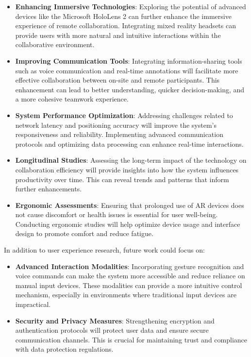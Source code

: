 \begin{itemize}
    \item \textbf{Enhancing Immersive Technologies}: Exploring the potential of advanced devices like the Microsoft HoloLens 2 can further enhance the immersive experience of remote collaboration. Integrating mixed reality headsets can provide users with more natural and intuitive interactions within the collaborative environment.
    \item \textbf{Improving Communication Tools}: Integrating information-sharing tools such as voice communication and real-time annotations will facilitate more effective collaboration between on-site and remote participants. This enhancement can lead to better understanding, quicker decision-making, and a more cohesive teamwork experience.
    \item \textbf{System Performance Optimization}: Addressing challenges related to network latency and positioning accuracy will improve the system's responsiveness and reliability. Implementing advanced communication protocols and optimizing data processing can enhance real-time interactions.


    \item \textbf{Longitudinal Studies}: Assessing the long-term impact of the technology on collaboration efficiency will provide insights into how the system influences productivity over time. This can reveal trends and patterns that inform further enhancements.
    \item \textbf{Ergonomic Assessments}: Ensuring that prolonged use of AR devices does not cause discomfort or health issues is essential for user well-being. Conducting ergonomic studies will help optimize device usage and interface design to promote comfort and reduce fatigue.

\end{itemize}

In addition to user experience research, future work could focus on:

\begin{itemize} 

    \item \textbf{Advanced Interaction Modalities}: Incorporating gesture recognition and voice commands can make the system more accessible and reduce reliance on manual input devices. These modalities can provide a more intuitive control mechanism, especially in environments where traditional input devices are impractical.
    
    \item \textbf{Security and Privacy Measures}: Strengthening encryption and authentication protocols will protect user data and ensure secure communication channels. This is crucial for maintaining trust and compliance with data protection regulations.
\end{itemize}


